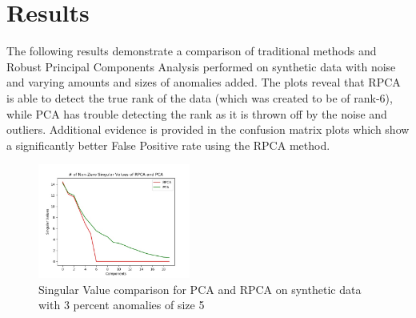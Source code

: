 \documentclass[conference]{IEEEtran}
\begin{document}

\section{Results}
The following results demonstrate a comparison of traditional methods and Robust Principal Components Analysis performed on synthetic data with noise and varying amounts and sizes of anomalies added.  The plots reveal that RPCA is able to detect the true rank of the data (which was created to be of rank-6), while PCA has trouble detecting the rank as it is thrown off by the noise and outliers.  Additional evidence is provided in the confusion matrix plots which show a significantly better False Positive rate using the RPCA method.


\begin{figure}[H]
    \centering
    \includegraphics[width=50mm, scale=0.5]{Singular_Value_Plot_Test_120AnomSize5.jpg}
    \caption{Singular Value comparison for PCA and RPCA on synthetic data with 3 percent anomalies of size 5}
    \label{fig:singvaltrain1205}
\end{figure}
\end{document}
